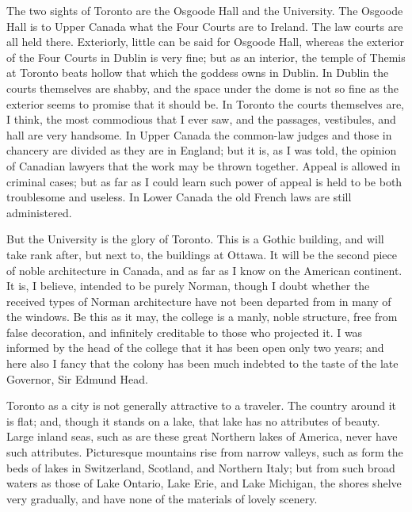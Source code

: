 The two sights of Toronto are the Osgoode Hall and the University.
The Osgoode Hall is to Upper Canada what the Four Courts are to
Ireland.  The law courts are all held there.  Exteriorly, little
can be said for Osgoode Hall, whereas the exterior of the Four
Courts in Dublin is very fine; but as an interior, the temple of
Themis at Toronto beats hollow that which the goddess owns in
Dublin.  In Dublin the courts themselves are shabby, and the space
under the dome is not so fine as the exterior seems to promise that
it should be.  In Toronto the courts themselves are, I think, the
most commodious that I ever saw, and the passages, vestibules, and
hall are very handsome.  In Upper Canada the common-law judges and
those in chancery are divided as they are in England; but it is, as
I was told, the opinion of Canadian lawyers that the work may be
thrown together.  Appeal is allowed in criminal cases; but as far
as I could learn such power of appeal is held to be both
troublesome and useless.  In Lower Canada the old French laws are
still administered.

But the University is the glory of Toronto.  This is a Gothic
building, and will take rank after, but next to, the buildings at
Ottawa.  It will be the second piece of noble architecture in
Canada, and as far as I know on the American continent.  It is, I
believe, intended to be purely Norman, though I doubt whether the
received types of Norman architecture have not been departed from
in many of the windows.  Be this as it may, the college is a manly,
noble structure, free from false decoration, and infinitely
creditable to those who projected it.  I was informed by the head
of the college that it has been open only two years; and here also
I fancy that the colony has been much indebted to the taste of the
late Governor, Sir Edmund Head.

Toronto as a city is not generally attractive to a traveler.  The
country around it is flat; and, though it stands on a lake, that
lake has no attributes of beauty.  Large inland seas, such as are
these great Northern lakes of America, never have such attributes.
Picturesque mountains rise from narrow valleys, such as form the
beds of lakes in Switzerland, Scotland, and Northern Italy; but
from such broad waters as those of Lake Ontario, Lake Erie, and
Lake Michigan, the shores shelve very gradually, and have none of
the materials of lovely scenery.

